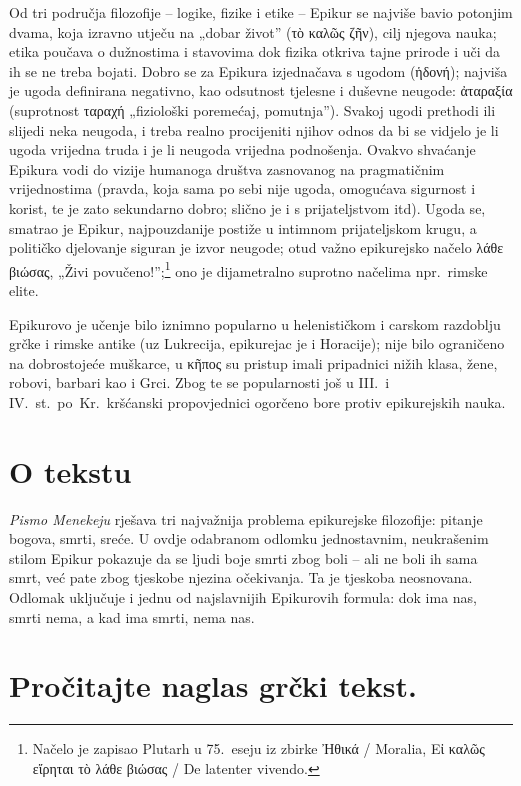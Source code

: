 Od tri područja filozofije – logike, fizike i etike – Epikur se najviše bavio potonjim dvama, koja izravno utječu na „dobar život” \textgreek{(τὸ καλῶς ζῆν),} cilj njegova nauka; etika poučava o dužnostima i stavovima dok fizika otkriva tajne prirode i uči da ih se ne treba bojati. Dobro se za Epikura izjednačava s ugodom \textgreek{(ἡδονή)}; najviša je ugoda definirana negativno, kao odsutnost tjelesne i duševne neugode: \textgreek{ἀταραξία} (suprotnost ταραχή „fiziološki poremećaj, pomutnja”). Svakoj ugodi prethodi ili slijedi neka neugoda, i treba realno procijeniti njihov odnos da bi se vidjelo je li ugoda vrijedna truda i je li neugoda vrijedna podnošenja. Ovakvo shvaćanje Epikura vodi do vizije humanoga društva zasnovanog na pragmatičnim vrijednostima (pravda, koja sama po sebi nije ugoda, omogućava sigurnost i korist, te je zato sekundarno dobro; slično je i s prijateljstvom itd). Ugoda se, smatrao je Epikur, najpouzdanije postiže u intimnom prijateljskom krugu, a političko djelovanje siguran je izvor neugode; otud važno epikurejsko načelo \textgreek{λάθε βιώσας}, „Živi povučeno!”;\footnote{Načelo je zapisao Plutarh u 75.\ eseju iz zbirke Ἠθικά / Moralia, \textgreek{Εἰ καλῶς εἴρηται τὸ λάθε βιώσας} / De latenter vivendo.} ono je dijametralno suprotno načelima npr.\ rimske elite.

Epikurovo je učenje bilo iznimno popularno u helenističkom i carskom razdoblju grčke i rimske antike (uz Lukrecija, epikurejac je i Horacije); nije bilo ograničeno na dobrostojeće muškarce, u \textgreek{κῆπος} su pristup imali pripadnici nižih klasa, žene, robovi, barbari kao i Grci. Zbog te se popularnosti još u III.\ i IV.~st.\ po~Kr.\ kršćanski propovjednici ogorčeno bore protiv epikurejskih nauka.

\section*{O tekstu}

\textit{Pismo Menekeju} rješava tri najvažnija problema epikurejske filozofije: pitanje bogova, smrti, sreće. U ovdje odabranom odlomku jednostavnim, neukrašenim stilom Epikur pokazuje da se ljudi boje smrti zbog boli – ali ne boli ih sama smrt, već pate zbog tjeskobe njezina očekivanja. Ta je tjeskoba neosnovana. Odlomak uključuje i jednu od najslavnijih Epikurovih formula: dok ima nas, smrti nema, a kad ima smrti, nema nas.


\section*{Pročitajte naglas grčki tekst.}

